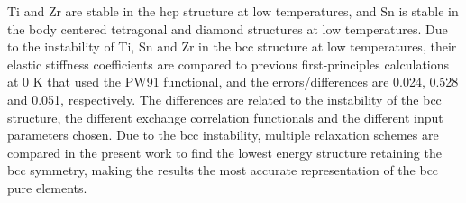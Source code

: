 Ti and Zr are stable in the hcp structure at low temperatures, and Sn is stable in the body centered tetragonal and diamond structures at low temperatures. Due to the instability of Ti, Sn and Zr in the bcc structure at low temperatures, their elastic stiffness coefficients are compared to previous first-principles calculations at 0 K \cite{Shang2010b} that used the PW91 functional, and the errors/differences are 0.024, 0.528 and 0.051, respectively. The differences are related to the instability of the bcc structure, the different exchange correlation functionals and the different input parameters chosen. Due to the bcc instability, multiple relaxation schemes are compared in the present work to find the lowest energy structure retaining the bcc symmetry, making the results the most accurate representation of the bcc pure elements.  

